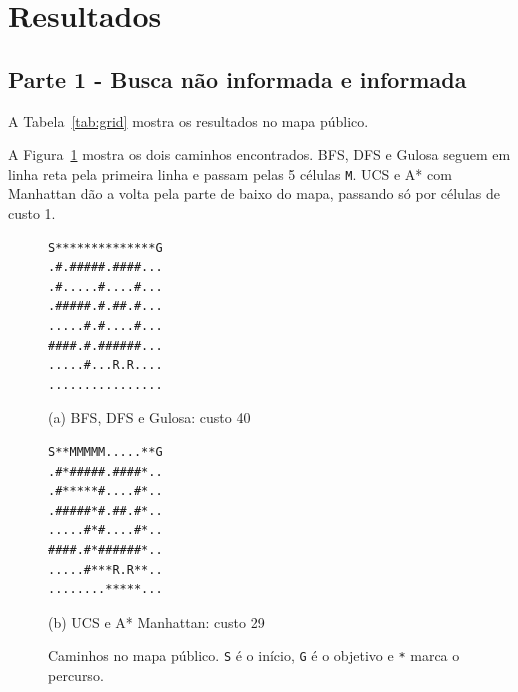 \documentclass[12pt]{article}
\begin{document}
\section{Resultados}
\subsection{Parte 1 - Busca não informada e informada}
A Tabela~\ref{tab:grid} mostra os resultados no mapa público.

\begin{table}[H]
\centering
\caption{Resultados dos algoritmos de busca no mapa de teste.}
\label{tab:grid}
\end{table}

A Figura~\ref{fig:caminhos} mostra os dois caminhos encontrados. BFS, DFS e Gulosa seguem em linha reta pela primeira linha e passam pelas 5 células \texttt{M}. UCS e A* com Manhattan dão a volta pela parte de baixo do mapa, passando só por células de custo 1.

\begin{figure}[H]
\centering
\begin{minipage}[t]{0.48\textwidth}
\centering
\small
\begin{verbatim}
S**************G
.#.#####.####...
.#.....#....#...
.#####.#.##.#...
.....#.#....#...
####.#.######...
.....#...R.R....
................
\end{verbatim}
(a) BFS, DFS e Gulosa: custo 40
\end{minipage}
\hfill
\begin{minipage}[t]{0.48\textwidth}
\centering
\small
\begin{verbatim}
S**MMMMM.....**G
.#*#####.####*..
.#*****#....#*..
.#####*#.##.#*..
.....#*#....#*..
####.#*######*..
.....#***R.R**..
........*****...
\end{verbatim}
(b) UCS e A* Manhattan: custo 29
\end{minipage}
\caption{Caminhos no mapa público. \texttt{S} é o início, \texttt{G} é o objetivo e \texttt{*} marca o percurso.}
\label{fig:caminhos}
\end{figure}
\end{document}
